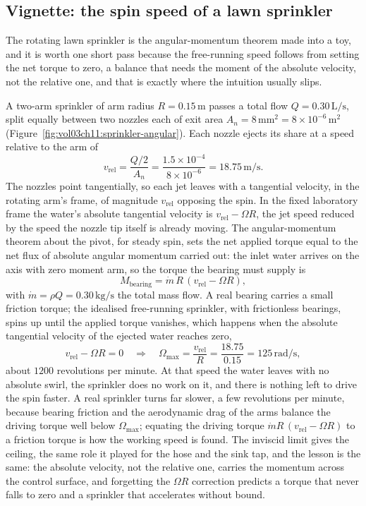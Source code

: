 \subsection{Vignette: the spin speed of a lawn sprinkler}

The rotating lawn sprinkler is the angular-momentum theorem made into a
toy, and it is worth one short pass because the free-running speed
follows from setting the net torque to zero, a balance that needs the
moment of the absolute velocity, not the relative one, and that is
exactly where the intuition usually slips.



A two-arm sprinkler of arm radius $R = 0.15\,\si{\meter}$ passes a total
flow $Q = 0.30\,\text{L/s}$, split equally between two nozzles each of
exit area $A_n = 8\,\si{\milli\meter}^2 = 8\times 10^{-6}\,\si{\meter}^2$
(Figure~\ref{fig:vol03ch11:sprinkler-angular}). Each nozzle ejects its
share at a speed relative to the arm of
\[
v_\text{rel} = \frac{Q/2}{A_n}
= \frac{1.5\times 10^{-4}}{8\times 10^{-6}}
= 18.75\,\si{\meter\per\second}.
\]
The nozzles point tangentially, so each jet leaves with a tangential
velocity, in the rotating arm's frame, of magnitude $v_\text{rel}$
opposing the spin. In the fixed laboratory frame the water's absolute
tangential velocity is $v_\text{rel} - \Omega R$, the jet speed reduced
by the speed the nozzle tip itself is already moving. The
angular-momentum theorem about the pivot, for steady spin, sets the net
applied torque equal to the net flux of absolute angular momentum
carried out: the inlet water arrives on the axis with zero moment arm,
so the torque the bearing must supply is
\[
M_\text{bearing} = \dot m\,R\,(v_\text{rel} - \Omega R),
\]
with $\dot m = \rho Q = 0.30\,\si{\kilogram\per\second}$ the total mass
flow. A real bearing carries a small friction torque; the idealised
free-running sprinkler, with frictionless bearings, spins up until the
applied torque vanishes, which happens when the absolute tangential
velocity of the ejected water reaches zero,
\[
v_\text{rel} - \Omega R = 0
\quad\Longrightarrow\quad
\Omega_\text{max} = \frac{v_\text{rel}}{R}
= \frac{18.75}{0.15} = 125\,\si{\radian\per\second},
\]
about $1200$ revolutions per minute. At that speed the water leaves with
no absolute swirl, the sprinkler does no work on it, and there is
nothing left to drive the spin faster. A real sprinkler turns far
slower, a few revolutions per minute, because bearing friction and the
aerodynamic drag of the arms balance the driving torque well below
$\Omega_\text{max}$; equating the driving torque $\dot m R\,(v_\text{rel}
- \Omega R)$ to a friction torque is how the working speed is found. The
inviscid limit gives the ceiling, the same role it played for the hose
and the sink tap, and the lesson is the same: the absolute velocity, not
the relative one, carries the momentum across the control surface, and
forgetting the $\Omega R$ correction predicts a torque that never falls
to zero and a sprinkler that accelerates without bound.

